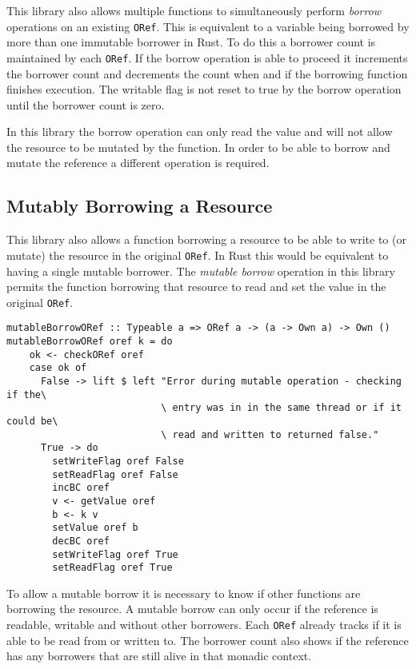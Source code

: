 \documentclass[onehalf,11pt]{beavtex}
\begin{document}
This library also allows multiple functions to simultaneously perform
\textit{borrow} operations on an existing \texttt{ORef}. This is equivalent to
a variable being borrowed by more than one immutable borrower in Rust. To do
this a borrower count is maintained by each \texttt{ORef}.
If the borrow operation is able to proceed it increments the borrower count
and decrements the count when and if the borrowing function finishes execution.
The writable flag is not reset to true by the borrow operation until the
borrower count is zero.

In this library the borrow operation can only read the value and will not allow
the resource to be mutated by the function.  In order to be able to borrow and
mutate the reference a different operation is required.

\subsection{Mutably Borrowing a Resource}

This library also allows a function borrowing a resource to be able to
write to (or mutate) the resource in the original \texttt{ORef}.  In Rust this
would be equivalent to having a single mutable borrower.
The \textit{mutable borrow} operation in this library permits the function
borrowing that resource to read and set the value in the original \texttt{ORef}.

\begin{verbatim}
mutableBorrowORef :: Typeable a => ORef a -> (a -> Own a) -> Own ()
mutableBorrowORef oref k = do
    ok <- checkORef oref
    case ok of
      False -> lift $ left "Error during mutable operation - checking if the\
                           \ entry was in in the same thread or if it could be\
                           \ read and written to returned false."
      True -> do
        setWriteFlag oref False
        setReadFlag oref False
        incBC oref
        v <- getValue oref
        b <- k v
        setValue oref b
        decBC oref
        setWriteFlag oref True
        setReadFlag oref True
\end{verbatim}

To allow a mutable borrow it is necessary to know if other functions are
borrowing the resource. A mutable borrow can only occur if the reference
is readable, writable and without other borrowers.
Each \texttt{ORef} already tracks if it is able to be read from or written to.
The borrower count also shows if the reference has any borrowers that are
still alive in that monadic context.
\end{document}

